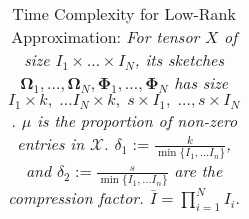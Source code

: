 \begin{table}[h]
\begin{tabular}{cccccl}
\end{tabular}
\caption{Time Complexity for Low-Rank Approximation: \textit{For tensor $X$ of size $I_1 \times \dots \times I_N$, its sketches $\mathbf{\Omega}_1, \dots, \mathbf{\Omega}_N, \mathbf{\Phi}_1, \dots, \mathbf{\Phi}_N$ has size $I_{1} \times k,\; \dots I_N \times k,\; s \times I_1, \; \dots, s\times I_N$. $\mu$ is the proportion of non-zero entries in $\mathscr{X}$. $\delta_1:= \frac{k}{\min\{I_1, \dots I_n\}}$, and $\delta_2 := \frac{s}{\min\{I_1, \dots I_n \}}$ are the compression factor. $\bar{I} = \prod_{i = 1}^N I_i$}.}
\end{table}